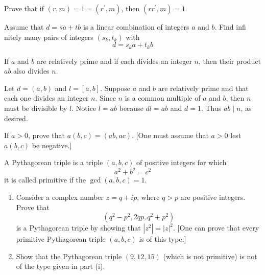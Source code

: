 \begin{questions}
\question
    Prove that if \((r, m)=1=\left(r^{\prime}, m\right)\), then \(\left(r r^{\prime}, m\right)=1\).


\begin{solution}
    
\end{solution}


\question
    Assume that \(d=s a+t b\) is a linear combination of integers \(a\) and \(b\). Find infi nitely many pairs of integers \(\left(s_k, t_k\right)\) with
\[
d=s_k a+t_k b
\]


\begin{solution}
    
\end{solution}


\question
    If \(a\) and \(b\) are relatively prime and if each divides an integer \(n\), then their product \(a b\) also divides \(n\).
\begin{theproof}
    Let \(d= \left( a,b \right)\) and \(l=[a,b]\).
    Suppose \(a\) and \(b\) are relatively prime and that each one divides an integer \(n\).
    Since \(n\) is  a common multiple of \(a\) and \(b\), then \(n\) must be divisible by \(l\).
    Notice \(l=ab\) because   \(dl = ab\) and  \(d=1\). Thus \(ab\mid n\), as desired.
\end{theproof}


\question
    If \(a>0\), prove that \(a(b, c)=(a b, a c)\). [One must assume that \(a>0\) lest \(a(b, c)\) be negative.]


\begin{solution}
    
\end{solution}


\question
     A Pythagorean triple is a triple \((a, b, c)\) of positive integers for which
\[
a^2+b^2=c^2
\]
it is called primitive if the \(\operatorname{gcd}(a, b, c)=1\).
\begin{enumerate}[label=(\alph*)]
    \item Consider a complex number \(z=q+i p\), where \(q>p\) are positive integers. Prove that
\[
\left(q^2-p^2, 2 q p, q^2+p^2\right)
\]
is a Pythagorean triple by showing that \(\left|z^2\right|=|z|^2\). [One can prove that every primitive Pythagorean triple \((a, b, c)\) is of this type.]
\item Show that the Pythagorean triple \((9,12,15)\) (which is not primitive) is not of the type given in part (i).

\end{enumerate}



\end{questions}
